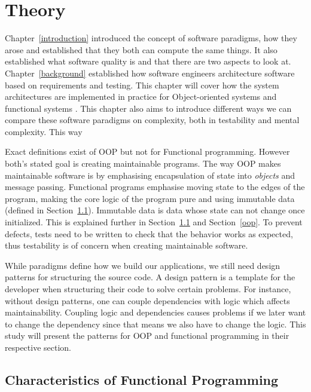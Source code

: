 \chapter{Theory}\label{theory} 

Chapter~\ref{introduction} introduced the concept of software paradigms, how
they arose and established that they both can compute the same things. It also
established what software quality is and that there are two aspects to look at.
Chapter~\ref{background} established how software engineers architecture
software based on requirements and testing. This chapter will cover how the
system architectures are implemented in practice for Object-oriented systems and
functional systems . This chapter also aims to introduce different ways we can
compare these software paradigms on complexity, both in testability and mental
complexity. This way 

Exact definitions exist of OOP but not for Functional programming. However
both's stated goal is creating maintainable programs.  The way OOP makes
maintainable software is by emphasising encapsulation of state into
\textit{objects} and message passing. Functional programs emphasise moving state
to the edges of the program, making the core logic of the program pure and using
immutable data (defined in Section~\ref{functionalprogramming}). Immutable data
is data whose state can not change once initialized. This is explained further
in Section~\ref{functionalprogramming} and Section~\ref{oop}. To prevent
defects, tests need to be written to check that the behavior works as expected,
thus testability is of concern when creating maintainable software.

While paradigms define how we build our applications, we still need design
patterns for structuring the source code. A design pattern is a template for the
developer when structuring their code to solve certain problems. For instance,
without design patterns, one can couple dependencies with logic which affects
maintainability. Coupling logic and dependencies causes problems if we later
want to change the dependency since that means we also have to change the logic.
This study will present the patterns for OOP and functional programming in their
respective section. 

\section{Characteristics of Functional Programming}\label{functionalprogramming}

